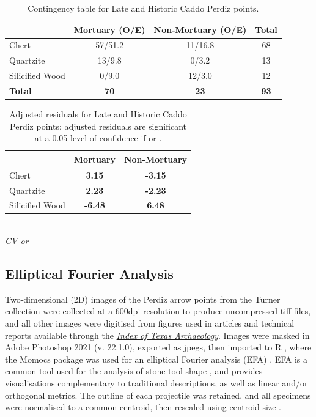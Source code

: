 \documentclass[review]{elsarticle}
\begin{document}
\begin{table}[tbh]\centering
\footnotesize
\caption{Contingency table for Late and Historic Caddo Perdiz points.}
\centering
\begin{tabular}{lccc}
\hline
 & Mortuary (O/E) & Non-Mortuary (O/E) & Total\\
\hline
Chert & 57/51.2 & 11/16.8 & 68\\
Quartzite & 13/9.8 & 0/3.2 & 13\\
Silicified Wood & 0/9.0 & 12/3.0 & 12\\
\hline
\textbf{Total} & \textbf{70} & \textbf{23} & \textbf{93}\\
\hline
\end{tabular}
\label{tab:Tbl3}
\end{table}

\begin{table}[tbh]\centering
\footnotesize
\caption{Adjusted residuals for Late and Historic Caddo Perdiz points; adjusted residuals are significant at a 0.05 level of confidence if \textbf{} or \textbf{}.}
\centering
\begin{tabular}{lcc}
\hline
 & Mortuary & Non-Mortuary\\
\hline
Chert & \textbf{3.15} & \textbf{-3.15}\\
Quartzite & \textbf{2.23} & \textbf{-2.23}\\
Silicified Wood & \textbf{-6.48} & \textbf{6.48}\\
\hline
\end{tabular}\\
\textit{CV  or }
\label{tab:Tbl4}
\end{table}

\subsection*{Elliptical Fourier Analysis}

Two-dimensional (2D) images of the Perdiz arrow points from the Turner collection were collected at a 600dpi resolution to produce uncompressed tiff files, and all other images were digitised from figures used in articles and technical reports available through the \href{https://scholarworks.sfasu.edu/ita/}{\textit{Index of Texas Archaeology}}. Images were masked in Adobe Photoshop 2021 (v. 22.1.0), exported as jpegs, then imported to R \citep{RN8584}, where the Momocs package was used for an elliptical Fourier analysis (EFA) \citep{RN8925}. EFA is a common tool used for the analysis of stone tool shape \citep{RN2805,RN9003,RN6313,RN5230,RN5225,RN5227,RN8358,RN8967,RN5231,RN7164,RN9004}, and provides visualisations complementary to traditional descriptions, as well as linear and/or orthogonal metrics. The outline of each projectile was retained, and all specimens were normalised to a common centroid, then rescaled using centroid size \citep{RN8923}. 
\end{document}
